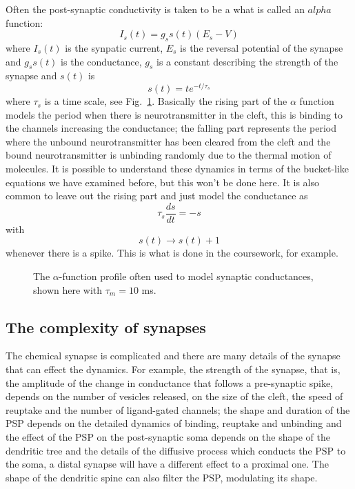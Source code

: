 \documentclass{article}
\begin{document}
Often the post-synaptic conductivity is taken to be a what is called an
$alpha$ function:
\begin{equation}
I_s(t)=g_ss(t)(E_s-V)
\end{equation}
where $I_s(t)$ is the synpatic current, $E_s$ is the reversal
potential of the synapse and $g_ss(t)$ is the conductance, $g_s$ is a
constant describing the strength of the synapse and $s(t)$ is 
\begin{equation}
s(t)=te^{-t/\tau_s}
\end{equation}
where $\tau_s$ is a time scale, see Fig.~\ref{fig:alpha}. Basically
the rising part of the $\alpha$ function models the period when there
is neurotransmitter in the cleft, this is binding to the channels
increasing the conductance; the falling part represents the period
where the unbound neurotransmitter has been cleared from the cleft and
the bound neurotransmitter is unbinding randomly due to the thermal
motion of molecules. It is possible to understand these dynamics in
terms of the bucket-like equations we have examined before, but this
won't be done here. It is also common to leave out the rising part and
just model the conductance as
\begin{equation}
\tau_s\frac{ds}{dt}=-s
\end{equation}
with
\begin{equation}
s(t)\rightarrow s(t)+1
\end{equation}
whenever there is a spike. This is what is done in the coursework, for
example.

\begin{figure}
\begin{center}

\end{center}
\caption{The $\alpha$-function profile often used to model synaptic
  conductances, shown here with $\tau_m=10$ ms.\label{fig:alpha}}
\end{figure}

\subsection*{The complexity of synapses}

The chemical synapse is complicated and there are many details of the
synapse that can effect the dynamics. For example, the strength of the
synapse, that is, the amplitude of the change in conductance that
follows a pre-synaptic spike, depends on the number of vesicles
released, on the size of the cleft, the speed of reuptake and the
number of ligand-gated channels; the shape and duration of the PSP
depends on the detailed dynamics of binding, reuptake and unbinding
and the effect of the PSP on the post-synaptic soma depends on the
shape of the dendritic tree and the details of the diffusive process
which conducts the PSP to the soma, a distal synapse will have a
different effect to a proximal one. The shape of the dendritic spine
can also filter the PSP, modulating its shape.
\end{document}
